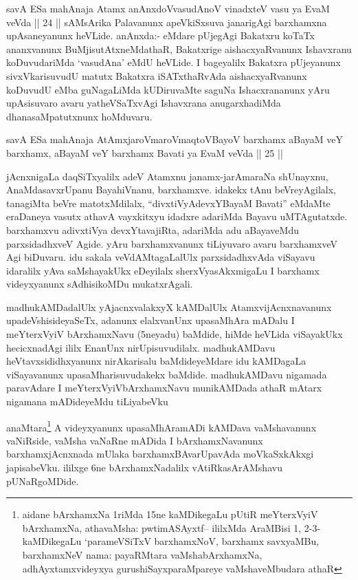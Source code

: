 \begin{artha}
savA ESa mahAnaja Atamx anAnxdoVvasudAnoV vinadxteV vasu ya EvaM veVda || 24 || sAMsArika Palavanunx apeVkiSxsuva janarigAgi barxhamxna upAsaneyanunx heVLide. anAnxda:- eMdare pUjegAgi Bakatxru koTaTx ananxvanunx BuMjisutAtxneMdathaR, Bakatxrige aishacxyaRvanunx Ishavxranu koDuvudariMda `vasudAna' eMdU heVLide. I bageyalilx Bakatxra pUjeyanunx sivxVkarisuvudU matutx Bakatxra iSATxthaRvAda aishacxyaRvanunx koDuvudU eMba guNagaLiMda kUDiruvaMte saguNa Ishacxrananunx yAru upAsisuvaro avaru yatheVSaTxvAgi Ishavxrana anugarxhadiMda dhanasaMpatutxnunx hoMduvaru. 

savA ESa mahAnaja AtAmx\s jaroV\s maroV\s maqtoV\s BayoV barxhamx aBayaM veY barxhamx, aBayaM veY barxhamx Bavati ya EvaM veVda || 25 ||
\end{artha}


\begin{artha}
jAcnxnigaLa daqSiTxyalilx adeV Atamxnu janamx-jarAmaraNa shUnayxnu, AnaMdasavxrUpanu BayahiVnanu, barxhamxve. idakekx tAnu beVreyAgilalx, tanagiMta beVre matotxMdilalx, ``divxtiVyAdevxYBayaM Bavati''  eMdaMte eraDaneya vasutx athavA vayxkitxyu idadxre adariMda Bayavu uMTAgutatxde. barxhamxvu adivxtiVya devxYtavajiRta, adariMda adu aBayaveMdu parxsidadhxveV Agide. yAru barxhamxvanunx tiLiyuvaro avaru barxhamxveV Agi biDuvaru. idu sakala veVdAMtagaLalUlx parxsidadhxvAda viSayavu idaralilx yAva saMshayakUkx eDeyilalx sherxVyasAkxmigaLu I barxhamx videyxyanunx sAdhisikoMDu mukatxrAgali.
\end{artha}



\begin{artha}
madhukAMDadalUlx yAjacnxvalakxyX kAMDalUlx AtamxvijAcnxnavanunx upadeVshisideyaSeTx, adanunx elalxvanUnx upasaMhAra mADalu I meYterxVyiV bArxhamxNavu (5neyadu) baMdide, hiMde heVLida viSayakUkx hecicxnadAgi ililx EnanUnx nirUpisuvudilalx. madhukAMDavu heVtavxsididhxyanunx nirAkarisalu baMdideyeMdare idu kAMDagaLa viSayavanunx upasaMharisuvudakekx baMdide. madhukAMDavu nigamada paravAdare I meYterxVyiVbArxhamxNavu munikAMDada athaR mAtarx nigamana mADideyeMdu tiLiyabeVku
\end{artha}

\begin{artha}
anaMtara\footnote{aidane bArxhamxNa 1riMda 15ne kaMDikegaLu pUtiR meYterxVyiV bArxhamxNa, athavaMsha: pwtimASAyxtf-- ililxMda AraMBisi 1, 2-3- kaMDikegaLu `parameVSiTxV barxhamxNoV, barxhamx savxyaMBu, barxhamxNeV nama: payaRMtara vaMshabArxhamxNa, adhAyxtamxvideyxya gurushiSayxparaMpareye vaMshaveMbudara athaR} A videyxyanunx upasaMhAramADi kAMDava vaMshavanunx vaNiRside, vaMsha vaNaRne mADida I bArxhamxNavanunx barxhamxjAcnxnada mUlaka barxhamxBAvarUpavAda moVkaSxkAkxgi japisabeVku. ililxge 6ne bArxhamxNadalilx vAtiRkasArAMshavu pUNaRgoMDide.
\end{artha}

